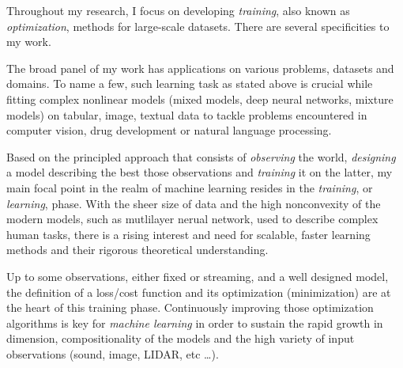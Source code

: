 \documentclass[twoside,11pt]{article}
\begin{document}
%
%
%
%
%
%
%


\textbf{}  \hfill \textbf{} 

 \hfill {}

\hfill

Throughout my research, I focus on developing \emph{training}, also known as \emph{optimization}, methods for large-scale datasets.
There are several specificities to my work.

The broad panel of my work has applications on various problems, datasets and domains.
To name a few, such learning task as stated above is crucial while fitting complex nonlinear models (mixed models, deep neural networks, mixture models) on tabular, image, textual data to tackle problems encountered in computer vision, drug development or natural language processing.

Based on the principled approach that consists of \emph{observing} the world, \emph{designing} a model describing the best those observations and \emph{training} it on the latter, my main focal point in the realm of machine learning resides in the \emph{training}, or \emph{learning}, phase.
With the sheer size of data and the high nonconvexity of the modern models, such as mutlilayer nerual network, used to describe complex human tasks, there is a rising interest and need for scalable, faster learning methods and their rigorous theoretical understanding.

Up to some observations, either fixed or streaming, and a well designed model, the definition of a loss/cost function and its optimization (minimization) are at the heart of this training phase.
Continuously improving those optimization algorithms is key for \emph{machine learning} in order to sustain the rapid growth in dimension, compositionality of the models and the high variety of input observations (sound, image, LIDAR, etc \dots).
\end{document}
